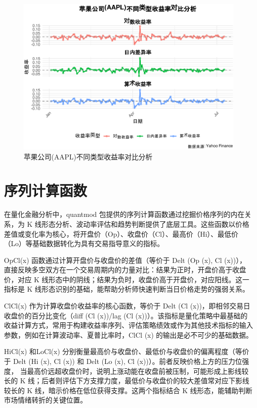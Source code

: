 \documentclass[]{ctexbook}
\begin{document}
\begin{figure}
\includegraphics[width=0.9\linewidth]{quantmod_files/figure-latex/visdeltall-1} \caption{苹果公司(AAPL)不同类型收益率对比分析}\label{fig:visdeltall}
\end{figure}

\section{序列计算函数}\label{ux5e8fux5217ux8ba1ux7b97ux51fdux6570}

在量化金融分析中，quantmod 包提供的序列计算函数通过挖掘价格序列的内在关系，为 K 线形态分析、波动率评估和趋势判断提供了底层工具。这些函数以价格差值或变化率为核心，将开盘价（Op）、收盘价（Cl）、最高价（Hi）、最低价（Lo）等基础数据转化为具有交易指导意义的指标。

OpCl(x) 函数通过计算开盘价与收盘价的差值（等价于 Delt (Op (x), Cl (x))），直接反映多空双方在一个交易周期内的力量对比：结果为正时，开盘价高于收盘价，对应 K 线形态中的阴线；结果为负时，收盘价高于开盘价，对应阳线。这一指标是 K 线形态识别的基础，能帮助分析师快速判断当日价格走势的强弱关系。

ClCl(x) 作为计算收盘价收益率的核心函数，等价于 Delt (Cl (x))，即相邻交易日收盘价的百分比变化（diff (Cl (x))/lag (Cl (x))）。该指标是量化策略中最基础的收益计算方式，常用于构建收益率序列、评估策略绩效或作为其他技术指标的输入参数，例如在计算波动率、夏普比率时，ClCl (x) 的输出是必不可少的基础数据。

HiCl(x) 和LoCl(x) 分别衡量最高价与收盘价、最低价与收盘价的偏离程度（等价于 Delt (Hi (x), Cl (x)) 和 Delt (Lo (x), Cl (x))）。前者反映价格上方的压力位强度， 当最高价远超收盘价时，说明上涨动能在收盘前被压制，可能形成上影线较长的 K 线；后者则评估下方支撑力度，最低价与收盘价的较大差值常对应下影线较长的 K 线，暗示价格在低位获得支撑。这两个指标结合 K 线形态，能辅助判断市场情绪转折的关键位置。
\end{document}
